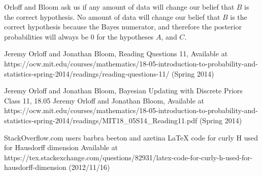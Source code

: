 \documentclass{article}
\begin{document}
Orloff and Bloom ask us if any amount of data will change our belief that
$B$ is the correct hypothesis.  No amount of data will change our belief
that $B$ is the correct hypothesis because the Bayes numerator, and
therefore the posterior probabilities will always be 0 for the hypotheses
$A$, and $C$.

\begin{thebibliography}{99}
Jeremy Orloff and Jonathan Bloom,
Reading Questions 11,
Available at https://ocw.mit.edu/courses/mathematics/18-05-introduction-to-probability-and-statistics-spring-2014/readings/reading-questions-11/
(Spring 2014)

Jeremy Orloff and Jonathan Bloom,
Bayesian Updating with Discrete Priors Class 11, 18.05 Jeremy Orloff and 
Jonathan Bloom,
Available at https://ocw.mit.edu/courses/mathematics/18-05-introduction-to-probability-and-statistics-spring-2014/readings/MIT18_05S14_Reading11.pdf
(Spring 2014)

StackOverflow.com users barbra beeton and azetina
LaTeX code for curly H used for Hausdorff dimension
Available at https://tex.stackexchange.com/questions/82931/latex-code-for-curly-h-used-for-hausdorff-dimension
(2012/11/16)


\end{thebibliography}
\end{document}
